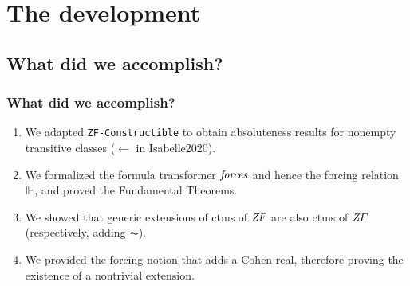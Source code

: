 \documentclass[english]{beamer}
\begin{document}

\section{The development}

\subsection{What did we accomplish?}

\begin{frame}
  \frametitle{What did we accomplish?}
  \begin{shadowblock}{}
    \begin{enumerate}
    \item<1-> We adapted \texttt{ZF-Constructible} to obtain
      absoluteness results for nonempty transitive classes ($\leftarrow$
      \alert{in Isabelle2020}).

    \item<3-> We formalized the formula transformer $\mathit{forces}$ and
      hence the forcing relation $\Vdash$, and proved the Fundamental
      Theorems.
    \item<4-> We showed that generic extensions of ctms of $\mathit{ZF}$ are also
      ctms of $\mathit{ZF}$ (respectively, adding $\AC$).
    \item<5-> We provided the forcing notion that adds a Cohen real,
      therefore proving the existence of a nontrivial extension.
    \end{enumerate}
  \end{shadowblock}
\end{frame}
\end{document}
